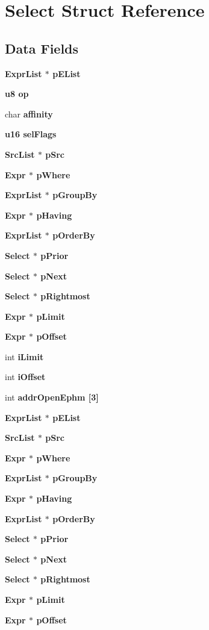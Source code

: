 \section{Select Struct Reference}
\label{structSelect}
\subsection*{Data Fields}
\begin{CompactItemize}
\item 
\bf{Expr\-List} $\ast$ \bf{p\-EList}
\item 
\bf{u8} \bf{op}
\item 
char \bf{affinity}
\item 
\bf{u16} \bf{sel\-Flags}
\item 
\bf{Src\-List} $\ast$ \bf{p\-Src}
\item 
\bf{Expr} $\ast$ \bf{p\-Where}
\item 
\bf{Expr\-List} $\ast$ \bf{p\-Group\-By}
\item 
\bf{Expr} $\ast$ \bf{p\-Having}
\item 
\bf{Expr\-List} $\ast$ \bf{p\-Order\-By}
\item 
\bf{Select} $\ast$ \bf{p\-Prior}
\item 
\bf{Select} $\ast$ \bf{p\-Next}
\item 
\bf{Select} $\ast$ \bf{p\-Rightmost}
\item 
\bf{Expr} $\ast$ \bf{p\-Limit}
\item 
\bf{Expr} $\ast$ \bf{p\-Offset}
\item 
int \bf{i\-Limit}
\item 
int \bf{i\-Offset}
\item 
int \bf{addr\-Open\-Ephm} [3]
\item 
\bf{Expr\-List} $\ast$ \bf{p\-EList}
\item 
\bf{Src\-List} $\ast$ \bf{p\-Src}
\item 
\bf{Expr} $\ast$ \bf{p\-Where}
\item 
\bf{Expr\-List} $\ast$ \bf{p\-Group\-By}
\item 
\bf{Expr} $\ast$ \bf{p\-Having}
\item 
\bf{Expr\-List} $\ast$ \bf{p\-Order\-By}
\item 
\bf{Select} $\ast$ \bf{p\-Prior}
\item 
\bf{Select} $\ast$ \bf{p\-Next}
\item 
\bf{Select} $\ast$ \bf{p\-Rightmost}
\item 
\bf{Expr} $\ast$ \bf{p\-Limit}
\item 
\bf{Expr} $\ast$ \bf{p\-Offset}
\end{CompactItemize}


